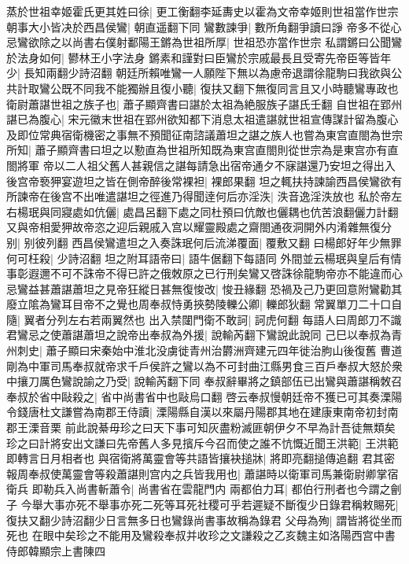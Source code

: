 蒸於世祖幸姬霍氏更其姓曰徐|{
	更工衡翻李延夀史以霍為文帝幸姬則世祖當作世宗}
朝事大小皆决於西昌侯鸞|{
	朝直遥翻下同}
鸞數諫爭|{
	數所角翻爭讀曰諍}
帝多不從心忌鸞欲除之以尚書右僕射鄱陽王鏘為世祖所厚|{
	世祖恐亦當作世宗}
私謂鏘曰公聞鸞於法身如何|{
	鬰林王小字法身}
鏘素和謹對曰臣鸞於宗戚最長且受寄先帝臣等皆年少|{
	長知兩翻少詩沼翻}
朝廷所賴唯鸞一人願陛下無以為慮帝退謂徐龍駒曰我欲與公共計取鸞公既不同我不能獨辦且復小聽|{
	復扶又翻下無復同言且又小時聽鸞專政也}
衛尉蕭諶世祖之族子也|{
	蕭子顯齊書曰諶於太祖為絶服族子諶氏壬翻}
自世祖在郢州諶已為腹心|{
	宋元徽末世祖在郢州欲知都下消息太祖遣諶就世祖宣傳謀計留為腹心}
及即位常典宿衛機密之事無不預聞征南諮議蕭坦之諶之族人也嘗為東宫直閤為世宗所知|{
	蕭子顯齊書曰坦之以懃直為世祖所知既為東宫直閤則從世宗為是東宫亦有直閤將軍}
帝以二人祖父舊人甚親信之諶每請急出宿帝通夕不寐諶還乃安坦之得出入後宫帝䙝狎宴遊坦之皆在側帝醉後常裸袒|{
	裸郎果翻}
坦之輒扶持諫諭西昌侯鸞欲有所諫帝在後宫不出唯遣諶坦之徑進乃得聞逹何后亦淫泆|{
	泆音逸淫泆放也}
私於帝左右楊珉與同寢處如伉儷|{
	處昌呂翻下處之同杜預曰伉敵也儷耦也伉苦浪翻儷力計翻}
又與帝相愛狎故帝恣之迎后親戚入宫以耀靈殿處之齋閤通夜洞開外内淆雜無復分别|{
	别彼列翻}
西昌侯鸞遣坦之入奏誅珉何后流涕覆面|{
	覆敷又翻}
曰楊郎好年少無罪何可枉殺|{
	少詩沼翻}
坦之附耳語帝曰|{
	語牛倨翻下每語同}
外間並云楊珉與皇后有情事彰遐邇不可不誅帝不得已許之俄敇原之已行刑矣鸞又啓誅徐龍駒帝亦不能違而心忌鸞益甚蕭諶蕭坦之見帝狂縱日甚無復悛改|{
	悛丑緣翻}
恐禍及己乃更回意附鸞勸其廢立隂為鸞耳目帝不之覺也周奉叔恃勇挾勢陵轢公卿|{
	轢郎狄翻}
常翼單刀二十口自隨|{
	翼者分列左右若兩翼然也}
出入禁闥門衛不敢訶|{
	訶虎何翻}
每語人曰周郎刀不識君鸞忌之使蕭諶蕭坦之說帝出奉叔為外援|{
	說輸芮翻下鸞說此說同}
己巳以奉叔為青州刺史|{
	蕭子顯曰宋秦始中淮北没虜徙青州治欝洲齊建元四年徙治胊山後復舊}
曹道剛為中軍司馬奉叔就帝求千戶侯許之鸞以為不可封曲江縣男食三百戶奉叔大怒於衆中攘刀厲色鸞說諭之乃受|{
	說輸芮翻下同}
奉叔辭畢將之鎮部伍已出鸞與蕭諶稱敇召奉叔於省中敺殺之|{
	省中尚書省中也敺烏口翻}
啓云奉叔慢朝廷帝不獲已可其奏溧陽令錢唐杜文謙嘗為南郡王侍讀|{
	溧陽縣自漢以來屬丹陽郡其地在建康東南帝初封南郡王溧音栗}
前此說綦毋珍之曰天下事可知灰盡粉滅匪朝伊夕不早為計吾徒無類矣珍之曰計將安出文謙曰先帝舊人多見擯斥今召而使之誰不忼慨近聞王洪範|{
	王洪範即轉言日月相者也}
與宿衛將萬靈會等共語皆攘袂搥牀|{
	將即亮翻搥傳追翻}
君其密報周奉叔使萬靈會等殺蕭諶則宫内之兵皆我用也|{
	蕭諶時以衛軍司馬兼衛尉卿掌宿衛兵}
即勒兵入尚書斬蕭令|{
	尚書省在雲龍門内}
兩都伯力耳|{
	都伯行刑者也今謂之劊子}
今舉大事亦死不舉事亦死二死等耳死社稷可乎若遲疑不斷復少日錄君稱敕賜死|{
	復扶又翻少詩沼翻少日言無多日也鸞錄尚書事故稱為錄君}
父母為殉|{
	謂皆將從坐而死也}
在眼中矣珍之不能用及鸞殺奉叔并收珍之文謙殺之乙亥魏主如洛陽西宫中書侍郎韓顯宗上書陳四

